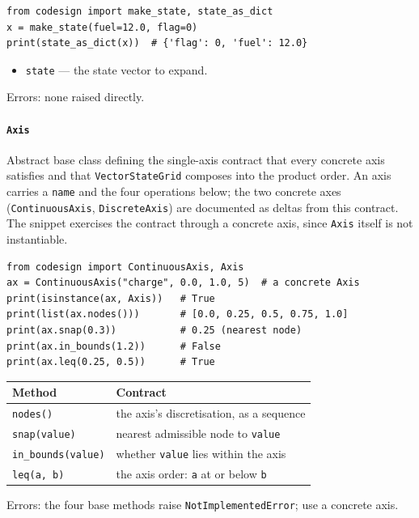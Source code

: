 \documentclass[11pt,a4paper]{article}
\begin{document}
\begin{lstlisting}
from codesign import make_state, state_as_dict
x = make_state(fuel=12.0, flag=0)
print(state_as_dict(x))  # {'flag': 0, 'fuel': 12.0}
\end{lstlisting}

\begin{itemize}[nosep]
  \item \texttt{state} --- the state vector to expand.
\end{itemize}
Errors: none raised directly.

\paragraph{\texttt{Axis}}\label{ref:state:axis}
Abstract base class defining the single-axis contract that every concrete
axis satisfies and that \texttt{VectorStateGrid} composes into the product
order. An axis carries a \texttt{name} and the four operations below; the
two concrete axes (\texttt{ContinuousAxis}, \texttt{DiscreteAxis}) are
documented as deltas from this contract. The snippet exercises the contract
through a concrete axis, since \texttt{Axis} itself is not instantiable.

\begin{lstlisting}
from codesign import ContinuousAxis, Axis
ax = ContinuousAxis("charge", 0.0, 1.0, 5)  # a concrete Axis
print(isinstance(ax, Axis))   # True
print(list(ax.nodes()))       # [0.0, 0.25, 0.5, 0.75, 1.0]
print(ax.snap(0.3))           # 0.25 (nearest node)
print(ax.in_bounds(1.2))      # False
print(ax.leq(0.25, 0.5))      # True
\end{lstlisting}

\begin{center}
\begin{tabular}{@{}ll@{}}
\toprule
Method & Contract \\
\midrule
\texttt{nodes()}          & the axis's discretisation, as a sequence \\
\texttt{snap(value)}      & nearest admissible node to \texttt{value} \\
\texttt{in\_bounds(value)} & whether \texttt{value} lies within the axis \\
\texttt{leq(a, b)}        & the axis order: \texttt{a} at or below \texttt{b} \\
\bottomrule
\end{tabular}
\end{center}
Errors: the four base methods raise \texttt{NotImplementedError}; use a
concrete axis.
\end{document}
